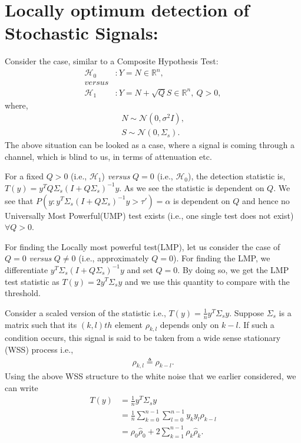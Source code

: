 \documentclass[a4paper,english,12pt]{article}
\begin{document}
\section{Locally optimum detection of Stochastic Signals:}
 Consider the case, similar to a Composite Hypothesis Test:
 \begin{align*}
 \mathcal{H}_0 &: Y = N \in \mathbb{R}^n,\\
 versus \\
 \mathcal{H}_1 &: Y = N+\sqrt{Q}S \in \mathbb{R}^n,~Q>0,
 \end{align*}
 where,  
 \begin{align*}  
 N\sim \mathcal{N}(0,\sigma^2I),\\
 S\sim \mathcal{N}(0,\Sigma_s).
 \end{align*}
 The above situation can be looked as a case, where a signal is coming through a channel, which is blind to us, in terms of attenuation etc.
 \par For a fixed $Q>0$ (i.e., $\mathcal{H}_1$) {\it versus} $Q=0$ (i.e., $\mathcal{H}_0$), the detection statistic is, $T(y)=y^TQ\Sigma_s(I+Q\Sigma_s)^{-1}y$. As we see the statistic is dependent on $Q$. We see that $P(y:y^T\Sigma_s(I+Q\Sigma_s)^{-1}y>\tau') = \alpha$ is dependent on $Q$ and hence no Universally Most Powerful(UMP) test exists (i.e., one single test does not exist) $\forall Q>0$.
 \par For finding the Locally most powerful test(LMP), let us consider the case of $Q=0$ {\it versus} $Q\neq0$ (i.e., approximately $Q=0$). For finding the LMP, we differentiate $y^T\Sigma_s(I+Q\Sigma_s)^{-1}y$ and set $Q=0$. By doing so, we get the LMP test statistic as $T(y)=2y^T\Sigma_sy$ and we use this quantity to compare with the threshold. 
 \par Consider a scaled version of the statistic i.e., $T(y)=\frac{1}{n}y^T\Sigma_sy$. Suppose $\Sigma_s$ is a matrix such that its $(k,l)th$ element $\rho_{k,l}$ depends only on $k-l$. If such a condition occurs, this signal is said to be taken from a wide sense stationary (WSS) process i.e., 
\begin{align*}
\rho_{k,l} \triangleq \rho_{k-l}.
\end{align*}
Using the above WSS structure to the white noise that we earlier considered, we can write
\begin{equation}
\begin{aligned}
T(y)&=\frac{1}{n}y^T\Sigma_sy \nonumber\\
&=\frac{1}{n}\sum\limits_{k=0}^{n-1}\sum\limits_{l=0}^{n-1}y_ky_l\rho_{k-l} \nonumber\\
&=\rho_0\hat{\rho}_0 + 2\sum\limits_{k=1}^{n-1}\rho_k\hat{\rho}_k.
\end{aligned}
\end{equation}
\end{document}
